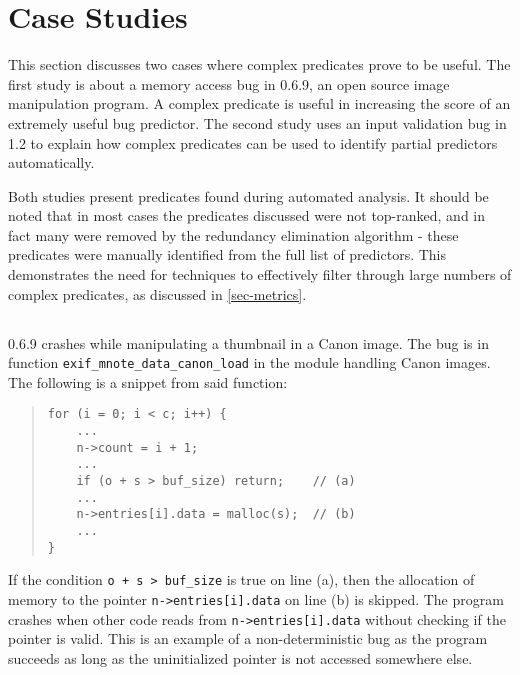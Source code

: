 
\section{Case Studies}
\label{sec-qual}
This section discusses two cases where complex predicates prove to be useful.  The first study is about a memory access bug in  0.6.9, an open source image manipulation program.  A complex predicate is useful in increasing the score of an extremely useful bug predictor.  The second study uses an input validation bug in  1.2 to explain how complex predicates can be used to identify partial predictors automatically.

Both studies present predicates found during automated analysis.  It should be noted that in most cases the predicates discussed were not top-ranked, and in fact many were removed by the redundancy elimination algorithm - these predicates were manually identified from the full list of predictors.  This demonstrates the need for techniques to effectively filter through large numbers of complex predicates, as discussed in \autoref{sec-metrics}.

\subsection{\large\textbf{}}
\label{sec-exif}

 0.6.9 crashes while manipulating a thumbnail in a Canon image.  The bug is in function \texttt{exif\_mnote\_data\_canon\_load} in the module handling Canon images.  The following is a snippet from said function:
\begin{quote}
\small
\begin{verbatim}
for (i = 0; i < c; i++) {
    ...
    n->count = i + 1;
    ...
    if (o + s > buf_size) return;    // (a)
    ...
    n->entries[i].data = malloc(s);  // (b)
    ...
}
\end{verbatim}
\end{quote}

If the condition \texttt{o + s > buf\_size} is true on line (a), then the allocation of memory to the pointer \texttt{n->entries[i].data} on line (b) is skipped.  The program crashes when other code reads from \texttt{n->entries[i].data} without checking if the pointer is valid.  This is an example of a non-deterministic bug as the program succeeds as long as the uninitialized pointer is not accessed somewhere else.

